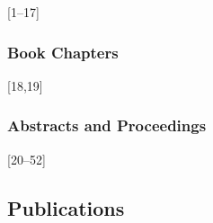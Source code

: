 \documentclass[
]{article}
\begin{document}
{[}1--17{]}

\subsubsection{Book Chapters}\label{book-chapters}

{[}18,19{]}

\subsubsection{Abstracts and
Proceedings}\label{abstracts-and-proceedings}

{[}20--52{]}

\subsection*{Publications}\label{publications}
\end{document}

